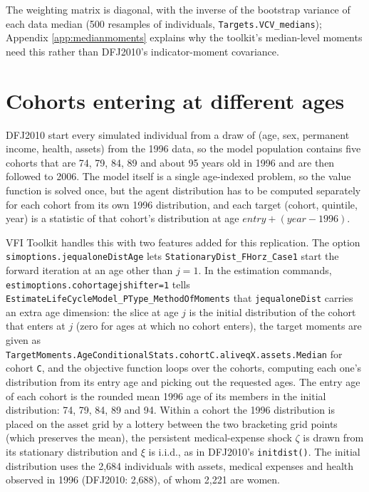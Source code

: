 \documentclass[11pt,fleqn]{article}
\begin{document}
The weighting matrix is diagonal, with the inverse of the bootstrap variance of each data median (500 resamples of individuals, \texttt{Targets.VCV\_medians}); Appendix \ref{app:medianmoments} explains why the toolkit's median-level moments need this rather than DFJ2010's indicator-moment covariance.

\section{Cohorts entering at different ages}\label{sec:cohorts}
DFJ2010 start every simulated individual from a draw of (age, sex, permanent income, health, assets) from the 1996 data, so the model population contains five cohorts that are 74, 79, 84, 89 and about 95 years old in 1996 and are then followed to 2006. The model itself is a single age-indexed problem, so the value function is solved once, but the agent distribution has to be computed separately for each cohort from its own 1996 distribution, and each target (cohort, quintile, year) is a statistic of that cohort's distribution at age $entry+(year-1996)$.

\begin{sloppypar}
VFI Toolkit handles this with two features added for this replication. The option \texttt{simoptions.jequaloneDistAge} lets \texttt{StationaryDist\_\allowbreak FHorz\_Case1} start the forward iteration at an age other than $j=1$. In the estimation commands, \texttt{estimoptions.cohortagejshifter=1} tells \texttt{EstimateLifeCycleModel\_\allowbreak PType\_\allowbreak MethodOfMoments} that \texttt{jequaloneDist} carries an extra age dimension: the slice at age $j$ is the initial distribution of the cohort that enters at $j$ (zero for ages at which no cohort enters), the target moments are given as \texttt{TargetMoments.AgeConditionalStats.\allowbreak cohortC.\allowbreak aliveqX.assets.Median} for cohort \texttt{C}, and the objective function loops over the cohorts, computing each one's distribution from its entry age and picking out the requested ages. The entry age of each cohort is the rounded mean 1996 age of its members in the initial distribution: 74, 79, 84, 89 and 94. Within a cohort the 1996 distribution is placed on the asset grid by a lottery between the two bracketing grid points (which preserves the mean), the persistent medical-expense shock $\zeta$ is drawn from its stationary distribution and $\xi$ is i.i.d., as in DFJ2010's \texttt{initdist()}. The initial distribution uses the 2,684 individuals with assets, medical expenses and health observed in 1996 (DFJ2010: 2,688), of whom 2,221 are women.
\end{sloppypar}
\end{document}

